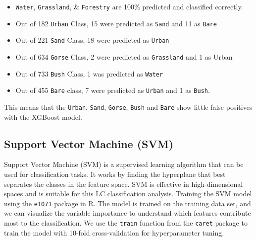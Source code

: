 \documentclass[
]{article}
\begin{document}
\begin{itemize}
\item
  \texttt{Water}, \texttt{Grassland}, \& \texttt{Forestry} are 100\%
  predicted and classified correctly.
\item
  Out of 182 \texttt{Urban} Class, 15 were predicted as \texttt{Sand}
  and 11 as \texttt{Bare}
\item
  Out of 221 \texttt{Sand} Class, 18 were predicted as \texttt{Urban}
\item
  Out of 634 \texttt{Gorse} Class, 2 were predicted as
  \texttt{Grassland} and 1 as Urban
\item
  Out of 733 \texttt{Bush} Class, 1 was predicted as \texttt{Water}
\item
  Out of 455 \texttt{Bare} class, 7 were predicted as \texttt{Urban} and
  1 as \texttt{Bush}.
\end{itemize}

This means that the \texttt{Urban}, \texttt{Sand}, \texttt{Gorse},
\texttt{Bush} and \texttt{Bare} show little false positives with the
XGBoost model.

\subsection{Support Vector Machine
(SVM)}\label{support-vector-machine-svm}

Support Vector Machine (SVM) is a supervised learning algorithm that can
be used for classification tasks. It works by finding the hyperplane
that best separates the classes in the feature space. SVM is effective
in high-dimensional spaces and is suitable for this LC classification
analysis. Training the SVM model using the \texttt{e1071} package in R.
The model is trained on the training data set, and we can visualize the
variable importance to understand which features contribute most to the
classification. We use the \texttt{train} function from the
\texttt{caret} package to train the model with 10-fold cross-validation
for hyperparameter tuning.
\end{document}

